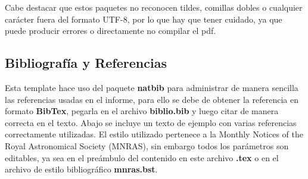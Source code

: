 \documentclass[11pt,letterpaper]{article}
\begin{document}
\begin{multicols}{2}

Cabe destacar que estos paquetes no reconocen tildes, comillas dobles o cualquier carácter fuera del formato UTF-8, por lo que hay que tener cuidado, ya que puede producir errores o directamente no compilar el pdf.

\subsection*{Bibliografía y Referencias}
Esta template hace uso del paquete \textbf{natbib} para administrar de manera sencilla las referencias usadas en el informe, para ello se debe de obtener la referencia en formato \textbf{BibTex}, pegarla en el archivo \textbf{biblio.bib} y luego citar de manera correcta en el texto. Abajo se incluye un texto de ejemplo con varias referencias correctamente utilizadas. El estilo utilizado pertenece a la Monthly Notices of the Royal Astronomical Society (MNRAS), sin embargo todos los parámetros son editables, ya sea en el preámbulo del contenido en este archivo \textbf{.tex} o en el archivo de estilo bibliográfico \textbf{mnras.bst}.


\end{multicols}
\end{document}
